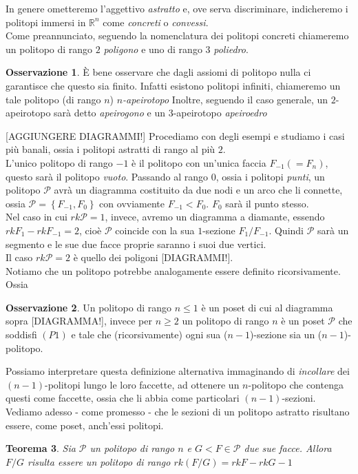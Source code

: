 \documentclass[a4paper,12pt]{report}
\newcommand{\Rn}{\mathbb{R}^n}
\newcommand{\p}{\mathcal{P}}
\theoremstyle{plain}
\newtheorem{teo}{Teorema}[chapter]
\theoremstyle{definition}
\newtheorem{oss}[teo]{Osservazione}
\begin{document}
In genere ometteremo l'aggettivo \emph{astratto} e, ove serva discriminare, indicheremo i politopi immersi in $\Rn$ come \emph{concreti} o
\emph{convessi}.\\
Come preannunciato, seguendo la nomenclatura dei politopi concreti chiameremo un politopo di rango $2$ \emph{poligono} e uno di rango $3$
\emph{poliedro}.
\begin{oss}
\`E bene osservare che dagli assiomi di politopo nulla ci garantisce che questo sia finito. Infatti esistono politopi infiniti, chiameremo un tale
politopo (di rango $n$) \emph{$n$-apeirotopo}
Inoltre, seguendo il caso generale, un $2$-apeirotopo sar\`a detto \emph{apeirogono} e un $3$-apeirotopo \emph{apeiroedro}
\end{oss}
[AGGIUNGERE DIAGRAMMI!]
Procediamo con degli esempi e studiamo i casi pi\`u banali, ossia i politopi astratti di rango al pi\`u $2$.\\
L'unico politopo di rango $-1$ \`e il politopo con un'unica faccia $F_{-1}(=F_n)$, questo sar\`a il politopo \emph{vuoto}.
Passando al rango $0$, ossia i politopi \emph{punti}, un politopo $\p$ avr\`a un diagramma costituito
da due nodi e un arco che li connette, ossia $\p=\left\{F_{-1},F_0\right\}$ con ovviamente $F_{-1}<F_0$. $F_0$ sar\`a il punto stesso.\\
Nel caso in cui $rk\p=1$, invece, avremo un diagramma a diamante, essendo $rkF_1-rkF_{-1}=2$, cio\`e $\p$ coincide con la sua 
$1$-sezione $F_1/F_{-1}$. Quindi $\p$ sar\`a un segmento e le sue due facce proprie saranno i suoi due vertici.\\
Il caso $rk\p=2$ \`e quello dei poligoni [DIAGRAMMI!].	\\
Notiamo che un politopo potrebbe analogamente essere definito ricorsivamente. Ossia
\begin{oss}
Un politopo di rango $n\leq 1$ \`e un poset di cui al diagramma sopra [DIAGRAMMA!], invece per $n\geq 2$ un politopo di rango $n$ \`e un poset $\p$ che
soddisfi $(P1)$ e tale che (ricorsivamente) ogni sua ($n-1$)-sezione sia un ($n-1$)-politopo.
\end{oss}
Possiamo interpretare questa definizione alternativa immaginando di \emph{incollare} dei $(n-1)$-politopi lungo le loro faccette, ad ottenere un
$n$-politopo che contenga questi come faccette, ossia che li abbia come particolari $(n-1)$-sezioni.\\
Vediamo adesso - come promesso - che le sezioni di un politopo astratto risultano essere, come poset, anch'essi politopi.
\begin{teo}
\label{teo:SectionIsPoly}
Sia $\p$ un politopo di rango $n$ e $G<F\in\p$ due sue facce. Allora $F/G$ risulta essere un politopo di rango $rk(F/G)=rkF-rkG-1$
\end{teo}
\end{document}
